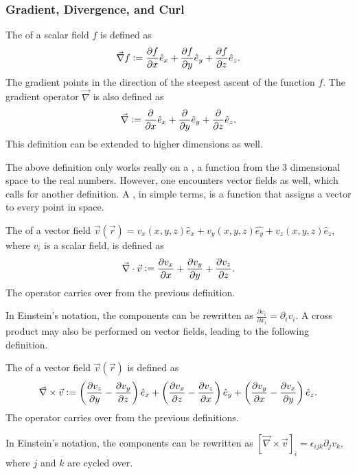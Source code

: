 \subsubsection{Gradient, Divergence, and Curl}
\begin{definition}
    The  of a scalar field $f$ is defined as
    \begin{equation}
        \vec{\nabla} f \vcentcolon=  \frac{\partial f}{\partial x} \hat{e}_{x} + \frac{\partial f}{\partial y} \hat{e}_{y} + \frac{\partial f}{\partial z} \hat{e}_{z}.
    \end{equation}
    The gradient points in the direction of the steepest ascent of the function $f$. The gradient operator $\vec{\nabla}$ is also defined as
    \begin{equation}
        \vec{\nabla} \vcentcolon= \frac{\partial}{\partial x} \hat{e}_{x} + \frac{\partial}{\partial y} \hat{e}_{y} + \frac{\partial}{\partial z} \hat{e}_{z}.
    \end{equation}
    This definition can be extended to higher dimensions as well.
\end{definition}
The above definition only works really on a , a function from the 3 dimensional space to the real numbers. However, one encounters vector fields as well, which calls for another definition. A , in simple terms, is a function that assigns a vector to every point in space. 
\begin{definition}
    The  of a vector field $\vec{v}(\vec{r}) = v_{x}(x,y,z) \hat{e}_{x} + v_{y}(x,y,z) \hat{e_{y}} + v_{z}(x,y,z) \hat{e}_{z}$, where $v_{i}$ is a scalar field, is defined as
    \begin{equation}
        \vec{\nabla} \cdot \vec{v} \vcentcolon= \frac{\partial v_{x}}{\partial x} + \frac{\partial v_{y}}{\partial y} + \frac{\partial v_{z}}{\partial z}.
    \end{equation}
    The operator carries over from the previous definition.
\end{definition}
In Einstein's notation, the components can be rewritten as $\frac{\partial v_{i}}{\partial x_{i}} = \partial_{i} v_{i}$. A cross product may also be performed on vector fields, leading to the following definition.
\begin{definition}
    The  of a vector field $\vec{v}(\vec{r})$ is defined as
    \begin{equation}
        \vec{\nabla} \times \vec{v} \vcentcolon= \left( \frac{\partial v_{z}}{\partial y} - \frac{\partial v_{y}}{\partial z} \right) \hat{e}_{x} + \left( \frac{\partial v_{x}}{\partial z} - \frac{\partial v_{z}}{\partial x} \right) \hat{e}_{y} + \left( \frac{\partial v_{y}}{\partial x} - \frac{\partial v_{x}}{\partial y} \right) \hat{e}_{z}.
    \end{equation}
    The operator carries over from the previous definitions.
\end{definition}
In Einstein's notation, the components can be rewritten as $[\vec{\nabla} \times \vec{v}]_{i} = \epsilon_{ijk} \partial_{j} v_{k}$, where $j$ and $k$ are cycled over.

